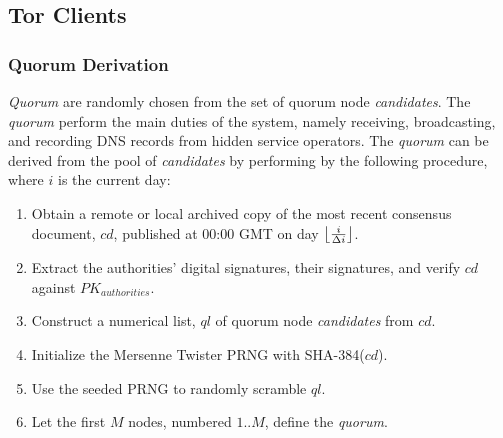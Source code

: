 

\subsection{Tor Clients}

\subsubsection{Quorum Derivation}
\label{sec:QuorumDerivation}

\emph{Quorum} are randomly chosen from the set of quorum node \emph{candidates}. The \emph{quorum} perform the main duties of the system, namely receiving, broadcasting, and recording DNS records from hidden service operators. The \emph{quorum} can be derived from the pool of \emph{candidates} by performing by the following procedure, where $ i $ is the current day:

\begin{enumerate}
	\item Obtain a remote or local archived copy of the most recent consensus document, $ cd $, published at 00:00 GMT on day $ \floor[\big]{\frac{i}{\Delta i}} $.
	\item Extract the authorities' digital signatures, their signatures, and verify $ cd $ against $ PK_{authorities} $.
	\item Construct a numerical list, $ ql $ of quorum node \emph{candidates} from $ cd $.
	\item Initialize the Mersenne Twister PRNG with SHA-384($ cd $).
	\item Use the seeded PRNG to randomly scramble $ ql $.
	\item Let the first $ M $ nodes, numbered $ 1 .. M $, define the \emph{quorum}.
\end{enumerate}

